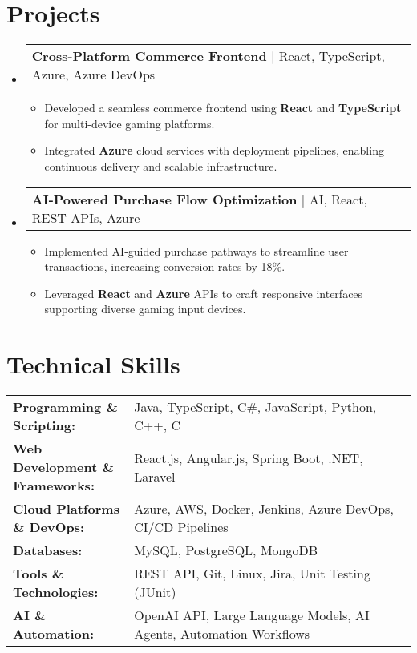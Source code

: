 \documentclass[letterpaper,11pt]{article}
\makeatletter
\newcommand{\resumeItem}[1]{
  \item\footnotesize{
    {#1 \vspace{-2pt}}
  }
}
\newcommand{\resumeProjectHeading}[2]{
    \item
    \begin{tabular*}{1.001\textwidth}{l@{\extracolsep{\fill}}r}
      \small#1 & \textbf{\small #2}\\
    \end{tabular*}\vspace{-7pt}
}
\newcommand{\resumeSubHeadingListStart}{\begin{itemize}[leftmargin=0pt, label={}]}
\newcommand{\resumeSubHeadingListEnd}{\end{itemize}}
\newcommand{\resumeItemListStart}{\begin{itemize}[leftmargin=*]}
\newcommand{\resumeItemListEnd}{\end{itemize}\vspace{-5pt}}
\makeatother
\begin{document}
\section{Projects}
    \vspace{-5pt}
    \resumeSubHeadingListStart
      \resumeProjectHeading
          {\textbf{Cross-Platform Commerce Frontend} | React, TypeScript, Azure, Azure DevOps}{}
          \resumeItemListStart
              \resumeItem{Developed a seamless commerce frontend using \textbf{React} and \textbf{TypeScript} for multi-device gaming platforms.}
              \resumeItem{Integrated \textbf{Azure} cloud services with deployment pipelines, enabling continuous delivery and scalable infrastructure.}
          \resumeItemListEnd
          \vspace{-16pt}
      \resumeProjectHeading
          {\textbf{AI-Powered Purchase Flow Optimization} | AI, React, REST APIs, Azure}{}
          \resumeItemListStart
              \resumeItem{Implemented AI-guided purchase pathways to streamline user transactions, increasing conversion rates by 18\%.}
              \resumeItem{Leveraged \textbf{React} and \textbf{Azure} APIs to craft responsive interfaces supporting diverse gaming input devices.}
          \resumeItemListEnd
          \vspace{-16pt}
    \resumeSubHeadingListEnd
\vspace{-10pt}
\section{Technical Skills}
        \vspace{-14pt}
        \begin{table}[h]
            \footnotesize
            \begin{tabular}{p{0.3\linewidth} p{0.7\linewidth}}
                \textbf{Programming \& Scripting:} & Java, TypeScript, C\#, JavaScript, Python, C++, C \\
                \textbf{Web Development \& Frameworks:} & React.js, Angular.js, Spring Boot, .NET, Laravel \\
                \textbf{Cloud Platforms \& DevOps:} & Azure, AWS, Docker, Jenkins, Azure DevOps, CI/CD Pipelines \\
                \textbf{Databases:} & MySQL, PostgreSQL, MongoDB \\
                \textbf{Tools \& Technologies:} & REST API, Git, Linux, Jira, Unit Testing (JUnit) \\
                \textbf{AI \& Automation:} & OpenAI API, Large Language Models, AI Agents, Automation Workflows \\
            \end{tabular}
        \end{table}
\end{document}
